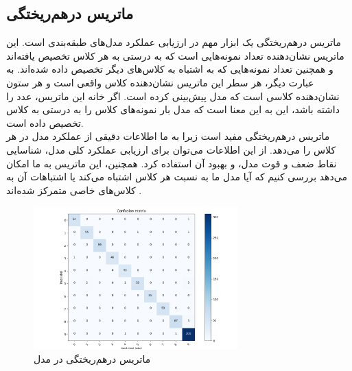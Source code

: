 \subsection{ماتریس درهم‌ریختگی\protect{}}
ماتریس درهم‌ریختگی یک ابزار مهم در ارزیابی عملکرد مدل‌های طبقه‌بندی است. این ماتریس نشان‌دهنده تعداد نمونه‌هایی است که به درستی به هر کلاس تخصیص یافته‌اند و همچنین تعداد نمونه‌هایی که به اشتباه به کلاس‌های دیگر تخصیص داده شده‌اند. به عبارت دیگر، هر سطر این ماتریس نشان‌دهنده کلاس واقعی است و هر ستون نشان‌دهنده کلاسی است که مدل پیش‌بینی کرده است. اگر خانه  این ماتریس، عدد  را داشته باشد، این به این معنا است که مدل  بار نمونه‌های کلاس  را به درستی به کلاس  تخصیص داده است.
\\
ماتریس درهم‌ریختگی مفید است زیرا به ما اطلاعات دقیقی از عملکرد مدل در هر کلاس را می‌دهد. از این اطلاعات می‌توان برای ارزیابی عملکرد کلی مدل، شناسایی نقاط ضعف و قوت مدل، و بهبود آن استفاده کرد. همچنین، این ماتریس به ما امکان می‌دهد بررسی کنیم که آیا مدل ما به نسبت هر کلاس اشتباه می‌کند یا اشتباهات آن به کلاس‌های خاصی متمرکز شده‌اند \cite{Confusio72:online}.

\begin{figure}[h]
    \centering
    \includegraphics[width=0.7\textwidth]{confusion_mlp.png}
    \caption{ ماتریس درهم‌ریختگی در مدل }
\end{figure}



